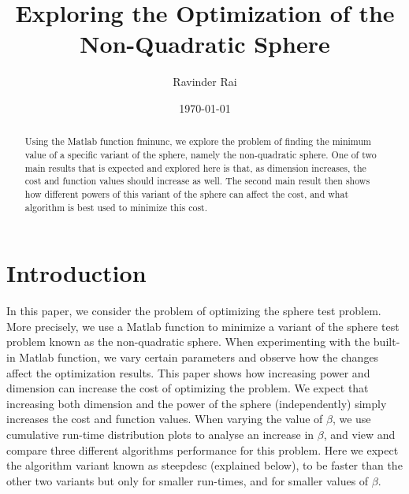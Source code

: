 \documentclass[sigconf, 7pt]{acmart}
\title{\textbf{Exploring the Optimization of the Non-Quadratic Sphere}}
\author{Ravinder Rai}
\date{\today}
\begin{document}
 



\begin{abstract}
Using the Matlab function fminunc, we explore the problem of finding the minimum value of a specific variant of the sphere, namely the non-quadratic sphere. One of two main results that is expected and explored here is that, as dimension increases, the cost and function values should increase as well. The second main result then shows how different powers of this variant of the sphere can affect the cost, and what algorithm is best used to minimize this cost.
\end{abstract}
\maketitle

\section{Introduction}
\label{sec:intro}

In this paper, we consider the problem of optimizing the sphere test problem. More precisely, we use a Matlab function to minimize a variant of the sphere test problem known as the non-quadratic sphere. When experimenting with the built-in Matlab function, we vary certain parameters and observe how the changes affect the optimization results. This paper shows how increasing power and dimension can increase the cost of optimizing the problem. We expect that increasing both dimension and the power of the sphere (independently) simply increases the cost and function values. When varying the value of $\beta$, we use cumulative run-time distribution plots to analyse an increase in $\beta$, and view and compare three different algorithms performance for this problem. Here we expect the algorithm variant known as steepdesc (explained below), to be faster than the other two variants but only for smaller run-times, and for smaller values of $\beta$.
\end{document}
